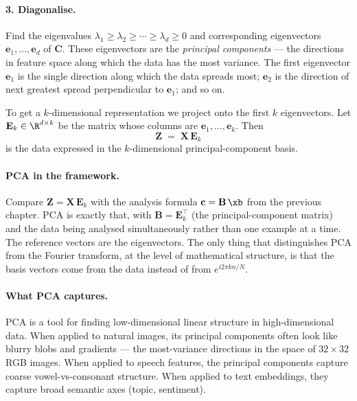 \paragraph{3. Diagonalise.}  Find the eigenvalues $\lambda_1 \ge
\lambda_2 \ge \cdots \ge \lambda_d \ge 0$ and corresponding eigenvectors
$\mathbf{e}_1, \ldots, \mathbf{e}_d$ of $\mathbf{C}$.  These eigenvectors
are the \emph{principal components} --- the directions in feature space
along which the data has the most variance.  The first eigenvector
$\mathbf{e}_1$ is the single direction along which the data spreads
most; $\mathbf{e}_2$ is the direction of next greatest spread
perpendicular to $\mathbf{e}_1$; and so on.

To get a $k$-dimensional representation we project onto the first $k$
eigenvectors.  Let $\mathbf{E}_k \in \R^{d \times k}$ be the matrix
whose columns are $\mathbf{e}_1, \ldots, \mathbf{e}_k$.  Then
\begin{equation}
    \mathbf{Z} \;=\; \mathbf{X}\, \mathbf{E}_k
\end{equation}
is the data expressed in the $k$-dimensional principal-component basis.


\paragraph{PCA in the framework.}  Compare $\mathbf{Z} = \mathbf{X}\,
\mathbf{E}_k$ with the analysis formula
$\mathbf{c} = \mathbf{B}\, \xb$ from the previous chapter.  PCA is
exactly that, with $\mathbf{B} = \mathbf{E}_k^\top$ (the principal-component
matrix) and the data being analysed simultaneously rather than one
example at a time.  The reference vectors are the eigenvectors.  The
only thing that distinguishes PCA from the Fourier transform, at the
level of mathematical structure, is that the basis vectors come from
the data instead of from $e^{i 2 \pi k n / N}$.

\paragraph{What PCA captures.}  PCA is a tool for finding low-dimensional
linear structure in high-dimensional data.  When applied to natural
images, its principal components often look like blurry blobs and
gradients --- the most-variance directions in the space of $32 \times 32$
RGB images.  When applied to speech features, the principal components
capture coarse vowel-vs-consonant structure.  When applied to text
embeddings, they capture broad semantic axes (topic, sentiment).


